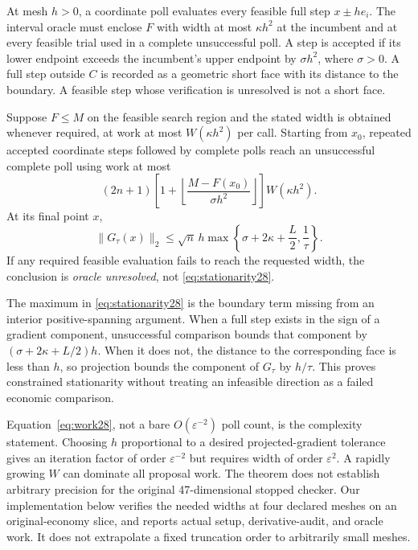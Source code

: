 At mesh $h>0$, a coordinate poll evaluates every feasible full step $x\pm he_i$. The interval oracle must enclose $F$ with width at most $\kappa h^2$ at the incumbent and at every feasible trial used in a complete unsuccessful poll. A step is accepted if its lower endpoint exceeds the incumbent's upper endpoint by $\sigma h^2$, where $\sigma>0$. A full step outside $C$ is recorded as a geometric short face with its distance to the boundary. A feasible step whose verification is unresolved is not a short face.
\begin{theorem}\label{thm:box28}
Suppose $F\le M$ on the feasible search region and the stated width is obtained whenever required, at work at most $W(\kappa h^2)$ per call. Starting from $x_0$, repeated accepted coordinate steps followed by complete polls reach an unsuccessful complete poll using work at most
\begin{equation}\label{eq:work28}
 (2n+1)\left[1+\left\lfloor\frac{M-F(x_0)}{\sigma h^2}\right\rfloor\right]W(\kappa h^2).
\end{equation}
At its final point $x$,
\begin{equation}\label{eq:stationarity28}
 \|G_\tau(x)\|_2\le\sqrt n\,h\max\left\{\sigma+2\kappa+\frac L2,\frac1\tau\right\}.
\end{equation}
If any required feasible evaluation fails to reach the requested width, the conclusion is \emph{oracle unresolved}, not \eqref{eq:stationarity28}.
\end{theorem}
The maximum in \eqref{eq:stationarity28} is the boundary term missing from an interior positive-spanning argument. When a full step exists in the sign of a gradient component, unsuccessful comparison bounds that component by $(\sigma+2\kappa+L/2)h$. When it does not, the distance to the corresponding face is less than $h$, so projection bounds the component of $G_\tau$ by $h/\tau$. This proves constrained stationarity without treating an infeasible direction as a failed economic comparison.

Equation~\eqref{eq:work28}, not a bare $O(\varepsilon^{-2})$ poll count, is the complexity statement. Choosing $h$ proportional to a desired projected-gradient tolerance gives an iteration factor of order $\varepsilon^{-2}$ but requires width of order $\varepsilon^2$. A rapidly growing $W$ can dominate all proposal work. The theorem does not establish arbitrary precision for the original 47-dimensional stopped checker. Our implementation below verifies the needed widths at four declared meshes on an original-economy slice, and reports actual setup, derivative-audit, and oracle work. It does not extrapolate a fixed truncation order to arbitrarily small meshes.

